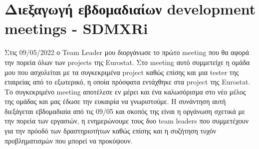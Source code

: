 \section*{Διεξαγωγή εβδομαδιαίων development meetings - SDMXRi}
Στις 09/05/2022 ο Team Leader μου διοργάνωσε το πρώτο meeting που θα αφορά την πορεία όλων των projects της Eurostat. Στο meeting αυτό συμμετείχε η ομάδα 
μου που ασχολείται με τα συγκεκριμένα project καθώς επίσης και μια tester της εταιρείας από το εξωτερικό, η οποία πρόσφατα εντάχθηκε στα project της Eurostat. 
Το συγκεκριμένο meeting αποτέλεσε εν μέρει και ένα καλωσόρισμα στο νέο μέλος της ομάδας και μας έδωσε την ευκαιρία να γνωριστούμε. Η συνάντηση αυτή διεξάγεται 
εβδομαδιαία από τις 09/05 και σκοπός της είναι η οργάνωση σχετικά με την πορεία των εργασιών, η ενημερώνουμε τους δυο team leaders που συμμετέχουν για την πρόοδό 
των δραστηριοτήτων καθώς επίσης και η συζήτηση τυχόν προβληματισμών που μπορεί να προκύψουν.

